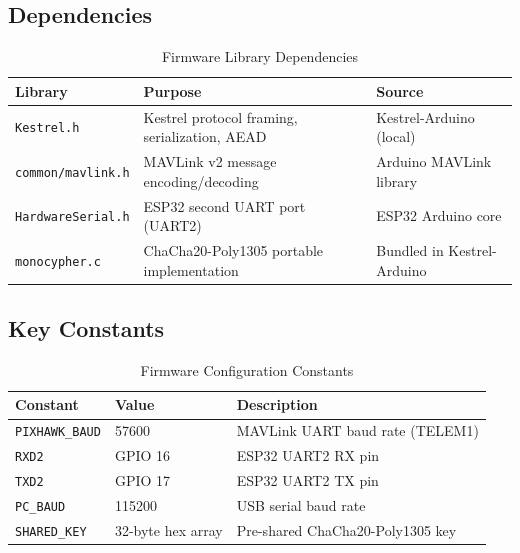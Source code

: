 \documentclass[11pt,a4paper]{article}
\begin{document}
\subsection{Dependencies}

\begin{table}[H]
    \centering
    \begin{tabularx}{\textwidth}{@{}lXl@{}}
        \toprule
        \textbf{Library} & \textbf{Purpose} & \textbf{Source} \\
        \midrule
        \texttt{Kestrel.h}    & Kestrel protocol framing, serialization, AEAD &
            Kestrel-Arduino (local) \\
        \texttt{common/mavlink.h} & MAVLink v2 message encoding/decoding &
            Arduino MAVLink library \\
        \texttt{HardwareSerial.h} & ESP32 second UART port (UART2) &
            ESP32 Arduino core \\
        \texttt{monocypher.c} & ChaCha20-Poly1305 portable implementation &
            Bundled in Kestrel-Arduino \\
        \bottomrule
    \end{tabularx}
    \caption{Firmware Library Dependencies}
\end{table}

\subsection{Key Constants}

\begin{table}[H]
    \centering
    \begin{tabular}{@{}lll@{}}
        \toprule
        \textbf{Constant}    & \textbf{Value}       & \textbf{Description} \\
        \midrule
        \texttt{PIXHAWK\_BAUD} & 57600              & MAVLink UART baud rate (TELEM1) \\
        \texttt{RXD2}          & GPIO 16            & ESP32 UART2 RX pin \\
        \texttt{TXD2}          & GPIO 17            & ESP32 UART2 TX pin \\
        \texttt{PC\_BAUD}      & 115200             & USB serial baud rate \\
        \texttt{SHARED\_KEY}   & 32-byte hex array  & Pre-shared ChaCha20-Poly1305 key \\
        \bottomrule
    \end{tabular}
    \caption{Firmware Configuration Constants}
\end{table}
\end{document}
